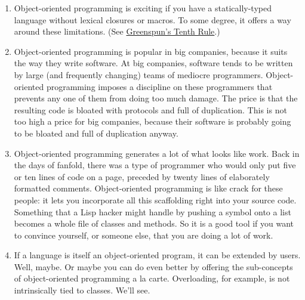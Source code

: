                  \begin{enumerate}
\item 
                      Object-oriented programming is exciting if you have a
                      statically-typed language without lexical closures or
                      macros. To some degree, it offers a way around these
                      limitations. (See
                      \href{http://www.paulgraham.com/quotes.html}{Greenspun's Tenth Rule}.)


                    
\item 
                      Object-oriented programming is popular in big companies,
                      because it suits the way they write software. At big
                      companies, software tends to be written by large (and
                      frequently changing) teams of mediocre programmers.
                      Object-oriented programming imposes a discipline on these
                      programmers that prevents any one of them from doing too
                      much damage. The price is that the resulting code is
                      bloated with protocols and full of duplication. This is
                      not too high a price for big companies, because their
                      software is probably going to be bloated and full of
                      duplication anyway.


                    
\item 
                      Object-oriented programming generates a lot of what looks
                      like work. Back in the days of fanfold, there was a type
                      of programmer who would only put five or ten lines of code
                      on a page, preceded by twenty lines of elaborately
                      formatted comments. Object-oriented programming is like
                      crack for these people: it lets you incorporate all this
                      scaffolding right into your source code. Something that a
                      Lisp hacker might handle by pushing a symbol onto a list
                      becomes a whole file of classes and methods. So it is a
                      good tool if you want to convince yourself, or someone
                      else, that you are doing a lot of work.


                    
\item 
                      If a language is itself an object-oriented program, it can
                      be extended by users. Well, maybe. Or maybe you can do
                      even better by offering the sub-concepts of
                      object-oriented programming a la carte. Overloading, for
                      example, is not intrinsically tied to classes. We'll
                      see.



\end{enumerate}
